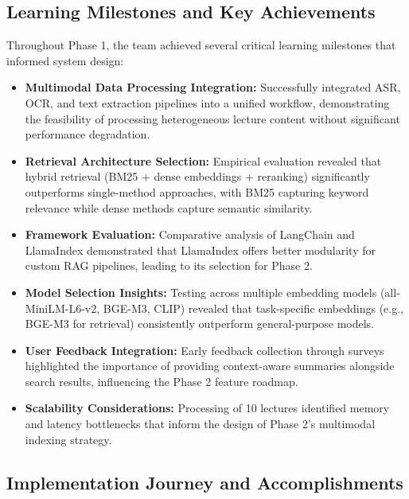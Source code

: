\subsection{Learning Milestones and Key Achievements}

Throughout Phase 1, the team achieved several critical learning milestones that informed system design:

\begin{itemize}
    \item \textbf{Multimodal Data Processing Integration:} Successfully integrated ASR, OCR, and text extraction pipelines into a unified workflow, demonstrating the feasibility of processing heterogeneous lecture content without significant performance degradation.
    
    \item \textbf{Retrieval Architecture Selection:} Empirical evaluation revealed that hybrid retrieval (BM25 + dense embeddings + reranking) significantly outperforms single-method approaches, with BM25 capturing keyword relevance while dense methods capture semantic similarity.
    
    \item \textbf{Framework Evaluation:} Comparative analysis of LangChain and LlamaIndex demonstrated that LlamaIndex offers better modularity for custom RAG pipelines, leading to its selection for Phase 2.
    
    \item \textbf{Model Selection Insights:} Testing across multiple embedding models (all-MiniLM-L6-v2, BGE-M3, CLIP) revealed that task-specific embeddings (e.g., BGE-M3 for retrieval) consistently outperform general-purpose models.
    
    \item \textbf{User Feedback Integration:} Early feedback collection through surveys highlighted the importance of providing context-aware summaries alongside search results, influencing the Phase 2 feature roadmap.
    
    \item \textbf{Scalability Considerations:} Processing of 10 lectures identified memory and latency bottlenecks that inform the design of Phase 2's multimodal indexing strategy.
\end{itemize}
\subsection{Implementation Journey and Accomplishments}

